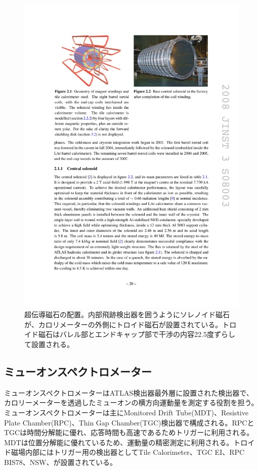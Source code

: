     \begin{figure} 
        \centering
        \includegraphics[width=16cm]{fig/Intro/ATLASmagnet.pdf}
        \caption[超伝導磁石の配置]{超伝導磁石の配置\cite{JINST:2008}。内部飛跡検出器を囲うようにソレノイド磁石が、カロリメーターの外側にトロイド磁石が設置されている。トロイド磁石はバレル部とエンドキャップ部で干渉の内容22.5度ずらして設置される。}
        \label{ATLASmagnet}
    \end{figure}
  
    \subsection{ミューオンスペクトロメーター}
ミューオンスペクトロメーターはATLAS検出器最外層に設置された検出器で、カロリーメーターを透過したミューオンの横方向運動量を測定する役割を担う。ミューオンスペクトロメーターは主にMonitored Drift Tube(MDT)、Resistive Plate Chamber(RPC)、Thin Gap Chamber(TGC)検出器で構成される。RPCとTGCは時間分解能に優れ、応答時間も高速であるためトリガーに利用される。MDTは位置分解能に優れているため、運動量の精密測定に利用される。トロイド磁場内部にはトリガー用の検出器としてTile Calorimeter、TGC EI、RPC BIS78、NSW、が設置されている。

